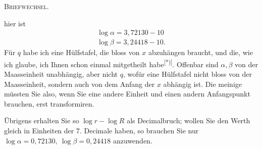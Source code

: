 \par\clearpage
{}\hfill\textsc{Briefwechsel.}\hfill\mbox{}\par\medskip
\noindent hier ist
\[
\begin{array}{l}
\log\alpha=3{,}72130-10\\
\log\beta=3{,}24418-10.
\end{array}
\]
Für \(q\) habe ich eine Hülfstafel, die bloss von \(x\) abzuhängen braucht, und die, wie ich glaube, ich Ihnen schon einmal mitgetheilt habe\textsuperscript{[*)]}. Offenbar sind \(\alpha,\beta\) von der Maasseinheit unabhängig, aber nicht \(q\), wofür eine Hülfstafel nicht bloss von der Maasseinheit, sondern auch von dem Anfang der \(x\) abhängig ist. Die meinige müssten Sie also, wenn Sie eine andere Einheit und einen andern Anfangspunkt brauchen, erst transformiren.

Übrigens erhalten Sie so \(\log r-\log R\) als Decimalbruch; wollen Sie den Werth gleich in Einheiten der 7. Decimale haben, so brauchen Sie nur \(\log\alpha=0{,}72130,\ \log\beta=0{,}24418\) anzuwenden.

